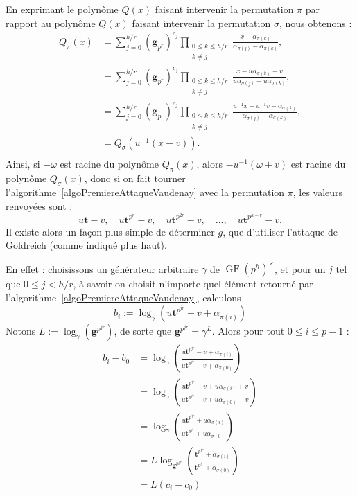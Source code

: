 \documentclass[a4paper, titlepage, 11pt]{article}
\theoremstyle{definition}
\theoremstyle{remark}
\def\gf{\operatorname{GF}}
\def\mbf#1{\mathbf{#1}}
\begin{document}
En exprimant le polynôme $Q(x)$ faisant intervenir la permutation $\pi$ par rapport au polynôme $Q(x)$ faisant intervenir la permutation $\sigma$, nous obtenons :
\begin{align*}
Q_\pi(x) &= \sum_{j=0}^{h/r} (\mbf g_{p^r})^{c_{j}} \prod_{\substack{0\leqslant k\leqslant h/r \\ k \neq j}}\frac{x-\alpha_{\pi(k)}}{\alpha_{\pi(j)}-\alpha_{\pi(k)}}, \\
&= \sum_{j=0}^{h/r} (\mbf g_{p^r})^{c_{j}} \prod_{\substack{0\leqslant k\leqslant h/r \\ k \neq j}}\frac{x-u\alpha_{\sigma(k)} - v}{u\alpha_{\sigma(j)}-u\alpha_{\sigma(k)}}, \\
&= \sum_{j=0}^{h/r} (\mbf g_{p^r})^{c_{j}} \prod_{\substack{0\leqslant k\leqslant h/r \\ k \neq j}}\frac{u^{-1}x - u^{-1}v-\alpha_{\sigma(k)}}{\alpha_{\sigma(j)}-\alpha_{\sigma(k)}}, \\
&= Q_\sigma(u^{-1}(x -v)). \\
\end{align*}
Ainsi, si $-\omega$ est racine du polynôme $Q_\pi(x)$, alors $-u^{-1}(\omega +v)$ est racine du polynôme $Q_\sigma(x)$, donc si on fait tourner l'algorithme~\ref{algoPremiereAttaqueVaudenay} avec la permutation $\pi$, les valeurs renvoyées sont :
$$u \mbf t -v,\quad u \mbf t^{p^r} -v,\quad u \mbf t^{p^{2r}} -v,\quad \dots,\quad u \mbf t^{p^{h - r}} -v.$$
Il existe alors un façon plus simple de déterminer $g$, que d'utiliser l'attaque de Goldreich (comme indiqué plus haut).

En effet : choisissons un générateur arbitraire $\gamma$ de $\gf(p^h)^\times$, et pour un $j$ tel que $0 \leqslant j < h/r$, à savoir on choisit n'importe quel élément retourné par l'algorithme~\ref{algoPremiereAttaqueVaudenay}, calculons $$b_i := \log_{\gamma}\left(u \mbf t^{p^{jr}} -v+\alpha_{\pi(i)}\right)$$
Notons $L := \log_{\gamma}(\mbf g^{p^{jr}})$, de sorte que $\mbf g^{p^{jr}}=\gamma^L$. Alors pour tout $0 \leqslant i \leqslant p-1$ :
\begin{align*}
b_i - b_0 &= \log_{\gamma}\left(\frac{u \mbf t^{p^{jr}} -v + \alpha_{\pi(i)}}{u \mbf t^{p^{jr}} -v + \alpha_{\pi(0)}}\right) \\
&= \log_{\gamma}\left(\frac{u \mbf t^{p^{jr}} -v + u \alpha_{\sigma(i)}+v}{u \mbf t^{p^{jr}} -v + u \alpha_{\sigma(0)}+v}\right)\\
&= \log_{\gamma}\left(\frac{u \mbf t^{p^{jr}} + u \alpha_{\sigma(i)}}{u \mbf t^{p^{jr}} + u \alpha_{\sigma(0)}}\right)\\
&= L\log_{\mbf g^{p^{jr}}}\left(\frac{\mbf t^{p^{jr}} + \alpha_{\sigma(i)}}{\mbf t^{p^{jr}} + \alpha_{\sigma(0)}}\right)\\
&= L(c_i - c_0) \\
\end{align*}
\end{document}
